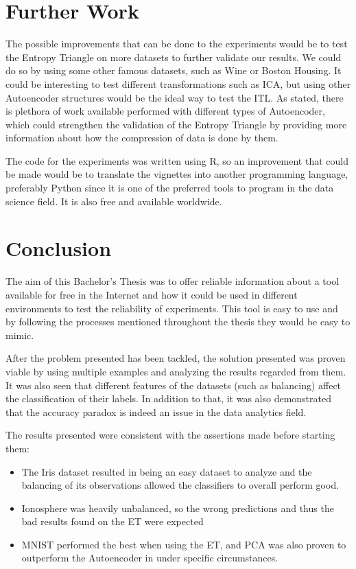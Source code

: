 \section{Further Work}

The possible improvements that can be done to the experiments would be to test the Entropy Triangle on more datasets to further validate our results. We could do so by using some other famous datasets, such as Wine or Boston Housing. It could be interesting to test different transformations such as ICA, but using other Autoencoder structures would be the ideal way to test the ITL. As stated, there is plethora of work available performed with different types of Autoencoder, which could strengthen the validation of the Entropy Triangle by providing more information about how the compression of data is done by them. \par

The code for the experiments was written using R, so an improvement that could be made would be to translate the vignettes into another programming language, preferably Python since it is one of the preferred tools to program in the data science field. It is also free and available worldwide. \par

\section{Conclusion}

The aim of this Bachelor's Thesis was to offer reliable information about a tool available for free in the Internet and how it could be used in different environments to test the reliability of experiments. This tool is easy to use and by following the processes mentioned throughout the thesis they would be easy to mimic. \par

After the problem presented has been tackled, the solution presented was proven viable by using multiple examples and analyzing the results regarded from them. It was also seen that different features of the datasets (such as balancing) affect the classification of their labels. In addition to that, it was also demonstrated that the accuracy paradox is indeed an issue in the data analytics field.

The results presented were consistent with the assertions made before starting them:
\begin{itemize}
	\item The Iris dataset resulted in being an easy dataset to analyze and the balancing of its observations allowed the classifiers to overall perform good.
	
	\item Ionosphere was heavily unbalanced, so the wrong predictions and thus the bad results found on the ET were expected
	
	\item MNIST performed the best when using the ET, and PCA was also proven to outperform the Autoencoder in under specific circumstances.
	
\end{itemize}

